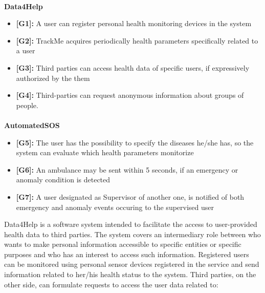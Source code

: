 \begin{flushleft}
\paragraph{}
\textbf{Data4Help}\par
\begin{itemize}
\item \textbf{[G1]:} A user can register personal health monitoring devices in the system
\item \textbf{[G2]:} TrackMe acquires periodically health parameters specifically related to a user
\item \textbf{[G3]:} Third parties can access health data of specific users, if expressively authorized by the them
\item \textbf{[G4]:} Third-parties can request anonymous information about groups of people.
\end{itemize}

\paragraph{}
\textbf{AutomatedSOS}
\begin{itemize}
\item \textbf{[G5]:} The user has the possibility to specify the diseases he/she has, so the system can evaluate which health parameters monitorize
\item \textbf{[G6]:} An ambulance may be sent within 5 seconds, if an emergency or anomaly condition is detected
\item \textbf{[G7]:} A user designated as Supervisor of another one, is notified of both emergency and anomaly events occuring to the supervised user
\end{itemize}


{}

{}
Data4Help is a software system intended to facilitate the access to user-provided health data to third parties. The system covers an intermediary role between who wants to make personal information accessible to specific entities or specific purposes and who has an interest to access such information. Registered users can be monitored using personal sensor devices registered in the service and send information related to her/his health status to the system. Third parties, on the other side, can formulate requests to access the user data related to:


\end{flushleft}
